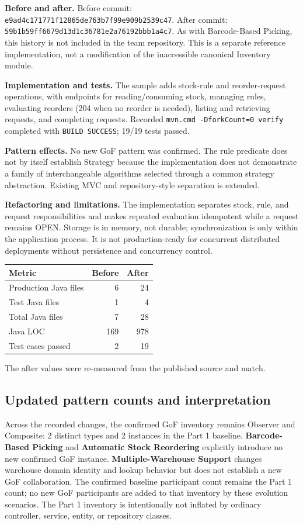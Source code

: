 \documentclass[11pt,a4paper]{article}
\newcommand{\code}[1]{\nolinkurl{#1}}
\begin{document}
\textbf{Before and after.} Before commit: \code{e9ad4c171771f12865de763b7f99e909b2539c47}. After commit: \code{59b1b59ff6679d13d1c36781e2a76192bbb1a4c7}. As with Barcode-Based Picking, this history is not included in the team repository. This is a separate reference implementation, not a modification of the inaccessible canonical Inventory module.

\textbf{Implementation and tests.} The sample adds stock-rule and reorder-request operations, with endpoints for reading/consuming stock, managing rules, evaluating reorders (204 when no reorder is needed), listing and retrieving requests, and completing requests. Recorded \code{mvn.cmd -DforkCount=0 verify} completed with \texttt{BUILD SUCCESS}; 19/19 tests passed.

\textbf{Pattern effects.} No new GoF pattern was confirmed. The rule predicate does not by itself establish Strategy because the implementation does not demonstrate a family of interchangeable algorithms selected through a common strategy abstraction. Existing MVC and repository-style separation is extended.

\textbf{Refactoring and limitations.} The implementation separates stock, rule, and request responsibilities and makes repeated evaluation idempotent while a request remains OPEN. Storage is in memory, not durable; synchronization is only within the application process. It is not production-ready for concurrent distributed deployments without persistence and concurrency control.


\begin{tabularx}{\linewidth}{@{}lrr@{}}
\toprule
Metric & Before & After\\
\midrule
Production Java files & 6 & 24\\
Test Java files & 1 & 4\\
Total Java files & 7 & 28\\
Java LOC & 169 & 978\\
Test cases passed & 2 & 19\\
\bottomrule
\end{tabularx}
The after values were re-measured from the published source and match.

\subsection{Updated pattern counts and interpretation}
Across the recorded changes, the confirmed GoF inventory remains Observer and Composite: 2 distinct types and 2 instances in the Part 1 baseline. \textbf{Barcode-Based Picking} and \textbf{Automatic Stock Reordering} explicitly introduce no new confirmed GoF instance. \textbf{Multiple-Warehouse Support} changes warehouse domain identity and lookup behavior but does not establish a new GoF collaboration. The confirmed baseline participant count remains the Part 1 count; no new GoF participants are added to that inventory by these evolution scenarios. The Part 1 inventory is intentionally not inflated by ordinary controller, service, entity, or repository classes.
\end{document}
